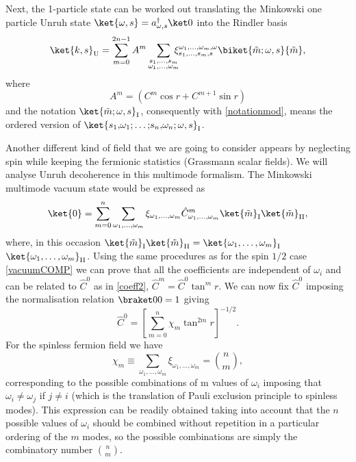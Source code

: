 Next, the 1-particle state can be worked out translating the Minkowski one particle Unruh state $\ket{\omega,s}=a^\dagger_{\omega,s}\ket0$ into the Rindler basis
\begin{equation}\label{onepart23m}
\ket{k,s}_\text{U}=\sum_{m=0}^{2n-1}A^m\sum_{\substack{s_1,\dots,s_m\\\omega_1,\dots,\omega_m}}\!\!\!\!\xi_{s_1,\dots,s_m,s}^{\omega_1,\dots,\omega_m,\omega} \biket{\tilde m;\omega,s}{\tilde m},
\end{equation}
where
\begin{equation}\label{Am}
A^m=(C^m\cos r+C^{m+1}\sin r)
\end{equation}
and the notation $\ket{\tilde m;\omega,s}_\text{I}$, consequently with \eqref{notationmod}, means the ordered version of 
$\ket{s_1,\!\omega_1;\dots;\!s_n,\!\omega_n;\omega,s}_\text{I}$. 

Another different kind of field that we are going to consider appears by neglecting spin while keeping the fermionic statistics (Grassmann scalar 
fields). We will analyse Unruh decoherence in this multimode formalism. The Minkowski multimode vacuum state would be expressed as
\begin{equation}\label{vacuzero}
\ket{0}=\sum_{m=0}^n\sum_{\omega_1,\dots,\omega_m}\xi_{\omega_1,\dots,\omega_m}\hat C^m_{\omega_1,\dots,\omega_m}\ket{\tilde m}_\text{I}\ket{\tilde m}_\text{II},
\end{equation}
where, in this occasion $\ket{\tilde m}_\text{I}\ket{\tilde m}_\text{II}=\ket{\omega_1,\dots,\omega_m}_\text{I}$ $\ket{\omega_1,\dots,\omega_m}_\text{II}$. Using the same procedures as for the spin $1/2$ 
case \eqref{vacuumCOMP} we can prove that all the coefficients are independent of $\omega_i$ and can be related to $\hat C^0$ as in \eqref{coeff2}, $\hat C^m=\hat C^0 \tan^m r$. We can now fix $\hat C^0$ imposing the normalisation relation $\braket00=1$ giving
\begin{equation}\label{normalizeropre}
\hat C^0=\left[\sum_{m=0}^n\chi_m\tan^{2m}r\right]^{-1/2}.
\end{equation}
For the spinless fermion field we have
\begin{equation}\label{XIIap}
\chi_m\equiv\sum_{\omega_1,\dots,\omega_m}\xi_{\omega_1,\dots,\omega_m}=\binom{n}{m},
\end{equation}
corresponding to the possible combinations of m values of $\omega_i$ imposing that $\omega_i\neq \omega_j$ if $j\neq i$ (which is the translation of Pauli exclusion principle to spinless modes). This expression can be readily obtained taking into account that the $n$ possible values of $\omega_i$ should be combined without repetition in a particular ordering of the $m$ modes, so the possible combinations are simply the combinatory number $\binom{n}{m}$.

